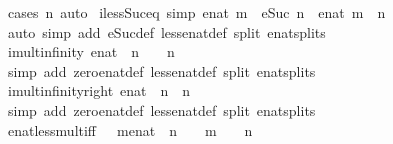 \begin{isabellebody}
\ {\isacharparenleft}cases\ n{\isacharparenright}\ auto%
\endisatagproof
{\isafoldproof}%
%
\isadelimproof
\isanewline
%
\endisadelimproof
\isanewline
{}\isamarkupfalse%
\ iless{\isacharunderscore}Suc{\isacharunderscore}eq\ {\isacharbrackleft}simp{\isacharbrackright}{\isacharcolon}\ {\isachardoublequoteopen}enat\ m\ {\isacharless}\ eSuc\ n\ {\isasymlongleftrightarrow}\ enat\ m\ {\isasymle}\ n{\isachardoublequoteclose}\isanewline
%
\isadelimproof
\ \ %
\endisadelimproof
%
\isatagproof
{}\isamarkupfalse%
\ {\isacharparenleft}auto\ simp\ add{\isacharcolon}\ eSuc{\isacharunderscore}def\ less{\isacharunderscore}enat{\isacharunderscore}def\ split{\isacharcolon}\ enat{\isachardot}splits{\isacharparenright}%
\endisatagproof
{\isafoldproof}%
%
\isadelimproof
\isanewline
%
\endisadelimproof
\isanewline
{}\isamarkupfalse%
\ imult{\isacharunderscore}infinity{\isacharcolon}\ {\isachardoublequoteopen}{\isacharparenleft}{}{\isacharcolon}{\isacharcolon}enat{\isacharparenright}\ {\isacharless}\ n\ {\isasymLongrightarrow}\ {\isasyminfinity}\ {\isacharasterisk}\ n\ {\isacharequal}\ {\isasyminfinity}{\isachardoublequoteclose}\isanewline
%
\isadelimproof
\ \ %
\endisadelimproof
%
\isatagproof
{}\isamarkupfalse%
\ {\isacharparenleft}simp\ add{\isacharcolon}\ zero{\isacharunderscore}enat{\isacharunderscore}def\ less{\isacharunderscore}enat{\isacharunderscore}def\ split{\isacharcolon}\ enat{\isachardot}splits{\isacharparenright}%
\endisatagproof
{\isafoldproof}%
%
\isadelimproof
\isanewline
%
\endisadelimproof
\isanewline
{}\isamarkupfalse%
\ imult{\isacharunderscore}infinity{\isacharunderscore}right{\isacharcolon}\ {\isachardoublequoteopen}{\isacharparenleft}{}{\isacharcolon}{\isacharcolon}enat{\isacharparenright}\ {\isacharless}\ n\ {\isasymLongrightarrow}\ n\ {\isacharasterisk}\ {\isasyminfinity}\ {\isacharequal}\ {\isasyminfinity}{\isachardoublequoteclose}\isanewline
%
\isadelimproof
\ \ %
\endisadelimproof
%
\isatagproof
{}\isamarkupfalse%
\ {\isacharparenleft}simp\ add{\isacharcolon}\ zero{\isacharunderscore}enat{\isacharunderscore}def\ less{\isacharunderscore}enat{\isacharunderscore}def\ split{\isacharcolon}\ enat{\isachardot}splits{\isacharparenright}%
\endisatagproof
{\isafoldproof}%
%
\isadelimproof
\isanewline
%
\endisadelimproof
\isanewline
{}\isamarkupfalse%
\ enat{\isacharunderscore}{}{\isacharunderscore}less{\isacharunderscore}mult{\isacharunderscore}iff{\isacharcolon}\ {\isachardoublequoteopen}{\isacharparenleft}{}\ {\isacharless}\ {\isacharparenleft}m{\isacharcolon}{\isacharcolon}enat{\isacharparenright}\ {\isacharasterisk}\ n{\isacharparenright}\ {\isacharequal}\ {\isacharparenleft}{}\ {\isacharless}\ m\ {\isasymand}\ {}\ {\isacharless}\ n{\isacharparenright}{\isachardoublequoteclose}\isanewline

\end{isabellebody}
